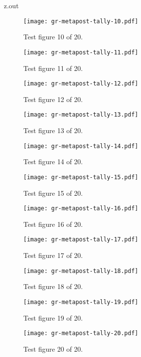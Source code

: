 \begin{VerbatimOut}{z.out}
\begin{figure}[ht]
  \centering
  \texttt{[image: gr-metapost-tally-10.pdf]}
  \caption{Test figure 10 of 20.}
  \label{fi:10of20}
\end{figure}

\begin{figure}[ht]
  \centering
  \texttt{[image: gr-metapost-tally-11.pdf]}
  \caption{Test figure 11 of 20.}
  \label{fi:11of20}
\end{figure}

\begin{figure}[ht]
  \centering
  \texttt{[image: gr-metapost-tally-12.pdf]}
  \caption{Test figure 12 of 20.}
  \label{fi:12of20}
\end{figure}

\begin{figure}[ht]
  \centering
  \texttt{[image: gr-metapost-tally-13.pdf]}
  \caption{Test figure 13 of 20.}
  \label{fi:13of20}
\end{figure}

\begin{figure}[ht]
  \centering
  \texttt{[image: gr-metapost-tally-14.pdf]}
  \caption{Test figure 14 of 20.}
  \label{fi:14of20}
\end{figure}

\begin{figure}[ht]
  \centering
  \texttt{[image: gr-metapost-tally-15.pdf]}
  \caption{Test figure 15 of 20.}
  \label{fi:15of20}
\end{figure}

\begin{figure}[ht]
  \centering
  \texttt{[image: gr-metapost-tally-16.pdf]}
  \caption{Test figure 16 of 20.}
  \label{fi:16of20}
\end{figure}

\begin{figure}[ht]
  \centering
  \texttt{[image: gr-metapost-tally-17.pdf]}
  \caption{Test figure 17 of 20.}
  \label{fi:17of20}
\end{figure}

\begin{figure}[ht]
  \centering
  \texttt{[image: gr-metapost-tally-18.pdf]}
  \caption{Test figure 18 of 20.}
  \label{fi:18of20}
\end{figure}

\begin{figure}[ht]
  \centering
  \texttt{[image: gr-metapost-tally-19.pdf]}
  \caption{Test figure 19 of 20.}
  \label{fi:19of20}
\end{figure}

\begin{figure}[ht]
  \centering
  \texttt{[image: gr-metapost-tally-20.pdf]}
  \caption{Test figure 20 of 20.}
  \label{fi:20of20}
\end{figure}
\end{VerbatimOut}

\MyIO

